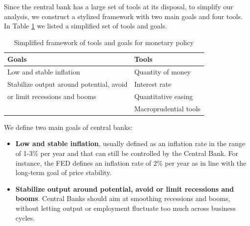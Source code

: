 \documentclass[11pt,a4paper,oneside]{book}
\begin{document}
Since the central bank has a large set of tools at its disposal, to simplify our analysis, we construct a stylized framework with two main goals and four tools. In Table \ref{tab:policy_goals_tools} we listed a simplified set of tools and goals.

\begin{table}[h!]
  \centering
    \begin{tabular}{ p{7cm} | p{7cm} }
	\textbf{Goals} & \textbf{Tools} \\
    \hline
       Low and stable inflation &  Quantity of money\\
	Stabilize output around potential, avoid & Interest rate  \\
	or limit recessions and booms & Quantitative easing \\
	& Macroprudential tools \\
    \end{tabular}
  \caption{Simplified framework of tools and goals for monetary policy}
  \label{tab:policy_goals_tools}
\end{table}


We define two main goals of central banks:
\begin{itemize}
  \item \textbf{Low and stable inflation}, usually defined as an inflation rate in the range of 1-3\% per year and that can still be controlled by the Central Bank. For instance, the FED defines an inflation rate of 2\% per year as in line with the long-term goal of price stability.
  \item \textbf{Stabilize output around potential, avoid or limit recessions and booms}. Central Banks should aim at smoothing recessions and booms, without letting output or employment fluctuate too much across business cycles.
\end{itemize}
\end{document}
